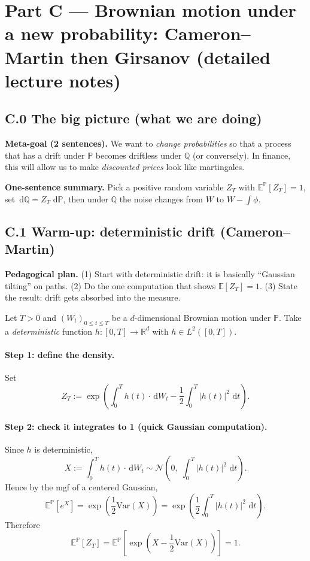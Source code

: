 \documentclass[11pt]{article}
\newcommand{\Pbb}{\mathbb{P}}
\newcommand{\Qbb}{\mathbb{Q}}
\newcommand{\E}{\mathbb{E}}
\newcommand{\R}{\mathbb{R}}
\newcommand{\dd}{\,\mathrm{d}}
\newcommand{\1}{\mathbf{1}}
\begin{document}
\section*{Part C --- Brownian motion under a new probability:
Cameron--Martin then Girsanov (detailed lecture notes)}

\subsection*{C.0 The big picture (what we are doing)}


\textbf{Meta-goal (2 sentences).}
We want to \emph{change probabilities} so that a process that has a drift under $\Pbb$
becomes driftless under $\Qbb$ (or conversely).
In finance, this will allow us to make \emph{discounted prices} look like martingales.



\textbf{One-sentence summary.}
Pick a positive random variable $Z_T$ with $\E^{\Pbb}[Z_T]=1$,
set $\dd\Qbb = Z_T\,\dd\Pbb$,
then under $\Qbb$ the noise changes from $W$ to $W-\int \phi$.

\subsection*{C.1 Warm-up: deterministic drift (Cameron--Martin)}


\textbf{Pedagogical plan.}
(1) Start with deterministic drift: it is basically ``Gaussian tilting'' on paths.
(2) Do the one computation that shows $\E[Z_T]=1$.
(3) State the result: drift gets absorbed into the measure.


Let $T>0$ and $(W_t)_{0\le t\le T}$ be a $d$-dimensional Brownian motion under $\Pbb$.
Take a \emph{deterministic} function $h:[0,T]\to\R^d$ with $h\in L^2([0,T])$.

\paragraph{Step 1: define the density.}
Set
\[
Z_T
:=
\exp\!\left(
\int_0^T h(t)\cdot \dd W_t
-
\frac12\int_0^T |h(t)|^2\,\dd t
\right).
\]

\paragraph{Step 2: check it integrates to 1 (quick Gaussian computation).}
Since $h$ is deterministic,
\[
X:=\int_0^T h(t)\cdot \dd W_t
\sim \mathcal N\!\left(0,\; \int_0^T |h(t)|^2\,\dd t\right).
\]
Hence by the mgf of a centered Gaussian,
\[
\E^{\Pbb}\!\left[e^{X}\right]
=
\exp\!\left(\frac12\text{Var}(X)\right)
=
\exp\!\left(\frac12\int_0^T |h(t)|^2\,\dd t\right).
\]
Therefore
\[
\E^{\Pbb}[Z_T]
=
\E^{\Pbb}\!\left[\exp\!\left(X-\frac12\text{Var}(X)\right)\right]
=
1.
\]
\end{document}
